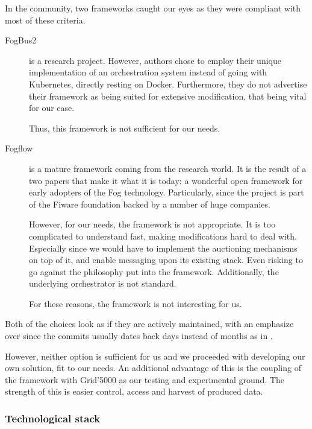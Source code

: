 In the community, two frameworks caught our eyes as they were compliant with most of these criteria.
\begin{description}
	\item[FogBus2 \cite{deng_fogbus2_2021}]{is a research project. However, authors chose to employ their unique implementation of an orchestration system instead of going with Kubernetes, directly resting on Docker. Furthermore, they do not advertise their framework as being suited for extensive modification, that being vital for our case.

	            Thus, this framework is not sufficient for our needs.
	      }
	\item[Fogflow \cite{smartfog_fogflow_2022}]{is a mature framework coming from the research world. It is the result of a two papers \cite{cheng_fogflow_2018, cheng_fog_2019} that make it what it is today: a wonderful open framework for early adopters of the Fog technology. Particularly, since the project is part of the Fiware foundation \cite{fiware_foundation_fiware_2021} backed by a number of huge companies.

	            However, for our needs, the framework is not appropriate. It is too complicated to understand fast, making modifications hard to deal with. Especially since we would have to implement the auctioning mechanisms on top of it, and enable messaging upon its existing stack. Even risking to go against the philosophy put into the framework. Additionally, the underlying orchestrator is not standard.

	            For these reasons, the framework is not interesting for us.}
\end{description}

Both of the choices look as if they are actively maintained, with an emphasize over \cite{smartfog_fogflow_2022} since the commits usually dates back days instead of months as in \cite{deng_fogbus2_2021}.

However, neither option is sufficient for us and we proceeded with developing our own solution, fit to our needs. An additional advantage of this is the coupling of the framework with Grid'5000 as our testing and experimental ground. The strength of this is easier control, access and harvest of produced data.


\subsubsection{Technological stack}

